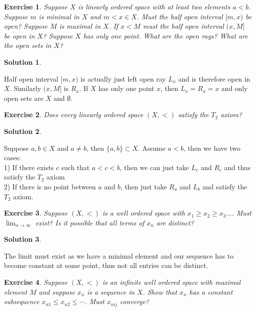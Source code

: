 \documentclass[11pt,a4paper]{article}
\newtheorem{Ex}{Exercise}
\newtheorem{Sol}{Solution}
\begin{document}
\begin{Ex}
	Suppose $X$ is linearly ordered space with at least two elements $a < b$. Suppose $m$ is minimal in $X$ and $m < x\in X$. Must the half open interval $[m,x)$ be open? Suppose $M$ is maximal in $X$. If $x<M$ must the half open interval $(x,M]$ be open in $X$? Suppose $X$ has only one point. What are the open rays? What are the open sets in $X$?
\end{Ex}
\begin{Sol}\end{Sol}
\noindent Half open interval $[m,x)$ is actually just left open ray $L_x$ and is therefore open in $X$. Similarly $(x,M]$ is $R_x$. If $X$ has only one point $x$, then $L_x = R_x = x$ and only open sets are $X$ and $\emptyset$.

\begin{Ex}
	Does every linearly ordered space $(X,<)$ satisfy the $T_2$ axiom?
 \end{Ex}

\begin{Sol}\end{Sol}
\noindent Suppose $a,b \in X$ and $a \neq b$, then $\{a,b\}\subset X$. Assume $a<b$, then we have two cases: \\
1) If there exists $c$ such that $a<c<b$, then we can just take $L_c$ and $R_c$ and thus satisfy the $T_2$ axiom\\
2) If there is no point between $a$ and $b$, then just take $R_a$ and $L_b$ and satisfy the $T_2$ axiom.

\begin{Ex}
	Suppose $(X,<)$ is a well ordered space with $x_1 \ge x_2 \ge x_3 \dots$. Must $\lim_{n \rightarrow \infty}$ exist? Is it possible that all terms of $x_n$ are distinct?
\end{Ex}

\begin{Sol}\end{Sol}
\noindent The limit must exist as we have a minimal element and our sequence has to become constant at some point, thus not all entries can be distinct.

\begin{Ex}
Suppose $(X,<)$ is an infinite well ordered space with maximal element $M$ and suppose $x_n$ is a sequence in $X$. Show that $x_n$ has a constant subsequence $ x_{n1} \le x_{n2} \le \cdots $. Must $x_{mj}$ converge? 
\end{Ex}
\end{document}
